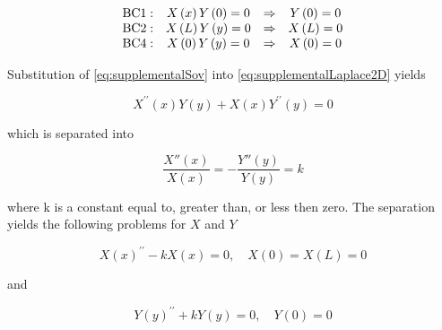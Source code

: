 \begin{equation}\label{eq:supplementalSovThreeZero}
\begin{array} { c c c c } 
{ \mathrm { BC1 } : } & { X\left(x\right)Y\left(0\right)= 0 } & { \Rightarrow } & { Y\left(0\right) = 0} \\ 
{ \mathrm { BC2 } : } & { X\left(L\right)Y\left(y\right) = 0 } & { \Rightarrow }  & { X\left(L\right) = 0} \\ 
{ \mathrm { BC4 } : } & { X\left(0\right)Y\left(y\right) = 0 } & { \Rightarrow } & { X\left(0\right) = 0} \end{array}
\end{equation}

Substitution of \ref{eq:supplementalSov} into \ref{eq:supplementalLaplace2D} yields

\begin{equation}\label{eq:supplementalSovLaplace2D}
X ^ { \prime \prime } \left( x \right) Y \left( y \right) + X \left( x \right) Y ^ { \prime \prime } \left( y \right) = 0
\end{equation}

which is separated into

\begin{equation}\label{eq:supplementalSovk}
\frac{X''\left(x\right)}{X\left(x\right)} = -\frac{Y''\left(y\right)}{Y\left(y\right)} = k
\end{equation}

where k is a constant equal to, greater than, or less then zero. The separation yields the following problems  for $X$ and $Y$

\begin{equation}\label{eq:supplementalSovX}
X\left(x\right) ^ { \prime \prime } - k X\left(x\right) = 0 , \quad X \left( 0 \right) = X \left( L \right) = 0
\end{equation}

and

\begin{equation}\label{eq:supplementalSovY}
Y\left(y\right) ^ { \prime \prime } + k Y\left(y\right) = 0 , \quad Y \left( 0 \right) = 0
\end{equation}


